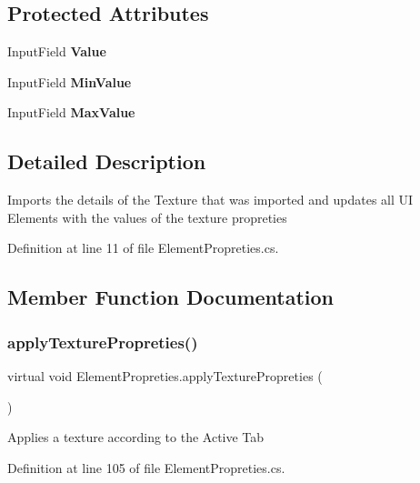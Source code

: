 \subsection*{Protected Attributes}
\begin{DoxyCompactItemize}
\item 
Input\+Field \textbf{ Value}
\item 
Input\+Field \textbf{ Min\+Value}
\item 
Input\+Field \textbf{ Max\+Value}
\end{DoxyCompactItemize}


\subsection{Detailed Description}
Imports the details of the Texture that was imported and updates all UI Elements with the values of the texture propreties 



Definition at line 11 of file Element\+Propreties.\+cs.



\subsection{Member Function Documentation}
\mbox{\label{class_element_propreties_a8d34b8dffb43f2e46a13d9bca33c0e5d}} 
\subsubsection{apply\+Texture\+Propreties()}
{\footnotesize\ttfamily virtual void Element\+Propreties.\+apply\+Texture\+Propreties (\begin{DoxyParamCaption}{ }\end{DoxyParamCaption})\hspace{0.3cm}{\ttfamily [virtual]}}



Applies a texture according to the Active Tab 



Definition at line 105 of file Element\+Propreties.\+cs.

\mbox{\label{class_element_propreties_a9cfc8f03dd658fbe38065e6d997ed283}} 
